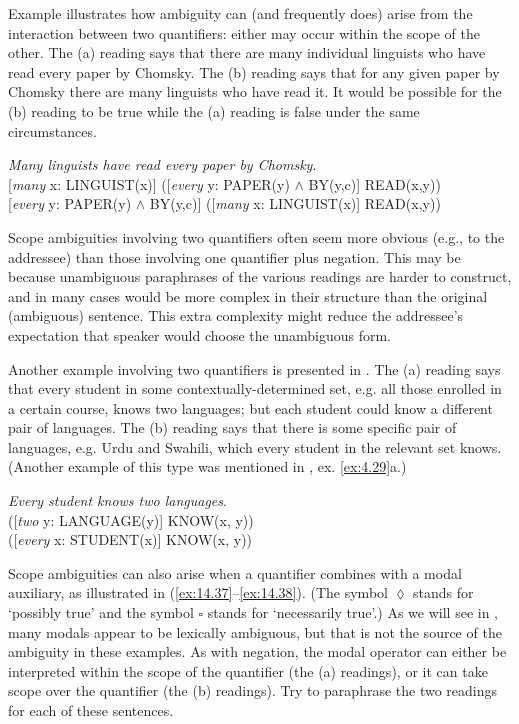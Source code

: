Example  illustrates how ambiguity can (and frequently does) arise from the interaction between two quantifiers: either may occur within the scope of the other. The (a) reading says that there are many individual linguists who have read every paper by Chomsky. The (b) reading says that for any given paper by Chomsky there are many linguists who have read it. It would be possible for the (b) reading to be true while the (a) reading is false under the same circumstances.


\ea \label{ex:14.35}
\textit{Many linguists have read every paper by Chomsky}.\\
\ea{}  [\textit{many} x: LINGUIST(x)] ([\textit{every} y: PAPER(y) $\wedge$ BY(y,c)] READ(x,y))\\
\ex{}  [\textit{every} y: PAPER(y) $\wedge$ BY(y,c)] ([\textit{many} x: LINGUIST(x)] READ(x,y))
                       \z
\z


Scope ambiguities involving two quantifiers often seem more obvious (e.g., to the addressee) than those involving one quantifier plus negation. This may be because unambiguous paraphrases of the various readings are harder to construct, and in many cases would be more complex in their structure than the original (ambiguous) sentence. This extra complexity might reduce the addressee's expectation that speaker would choose the unambiguous form.


Another example involving two quantifiers is presented in . The (a) reading says that every student in some contextually-determined set, e.g. all those enrolled in a certain course, knows two languages; but each student could know a different pair of languages. The (b) reading says that there is some specific pair of languages, e.g.  {Urdu} and  {Swahili}, which every student in the relevant set knows. (Another example of this type was mentioned in , ex. \ref{ex:4.29}a.)


\ea \label{ex:14.36}
\textit{Every student knows two languages}.\\
 ([\textit{two} y: LANGUAGE(y)] KNOW(x, y))\\
 ([\textit{every} x: STUDENT(x)] KNOW(x, y))
                       \z
\z


Scope ambiguities can also arise when a quantifier combines with a modal auxiliary, as illustrated in (\ref{ex:14.37}--\ref{ex:14.38}). (The symbol ${\lozenge}$ stands for ‘possibly true’ and the symbol ${\square}$ stands for ‘necessarily true’.) As we will see in , many modals appear to be lexically ambiguous, but that is not the source of the ambiguity in these examples. As with negation, the modal operator can either be interpreted within the scope of the quantifier (the (a) readings), or it can take scope over the quantifier (the (b) readings). Try to paraphrase the two readings for each of these sentences.


